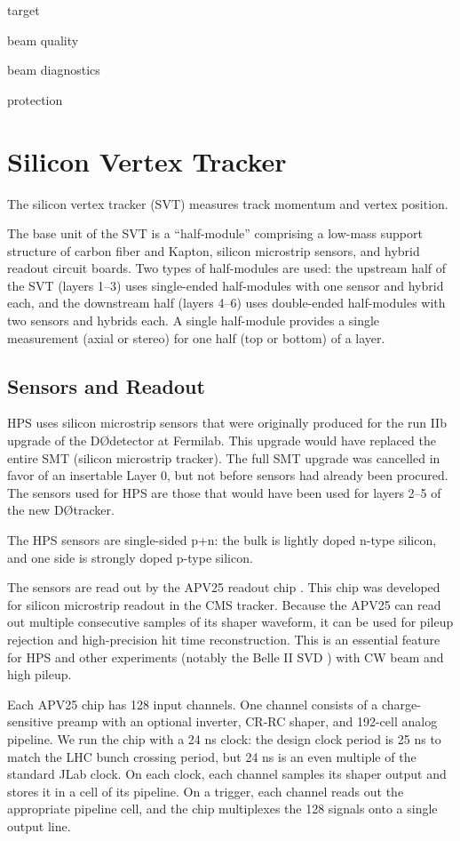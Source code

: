 target

beam quality

beam diagnostics

protection

\section{Silicon Vertex Tracker}
The silicon vertex tracker (SVT) measures track momentum and vertex position.



The base unit of the SVT is a ``half-module'' comprising a low-mass support structure of carbon fiber and Kapton, silicon microstrip sensors, and hybrid readout circuit boards.
Two types of half-modules are used: the upstream half of the SVT (layers 1--3) uses single-ended half-modules with one sensor and hybrid each, and the downstream half (layers 4--6) uses double-ended half-modules with two sensors and hybrids each.
A single half-module provides a single measurement (axial or stereo) for one half (top or bottom) of a layer.

\subsection{Sensors and Readout}
HPS uses silicon microstrip sensors that were originally produced for the run IIb upgrade of the D\O detector at Fermilab.
This upgrade would have replaced the entire SMT (silicon microstrip tracker).
The full SMT upgrade was cancelled in favor of an insertable Layer 0, but not before sensors had already been procured.
The sensors used for HPS are those that would have been used for layers 2--5 of the new D\O tracker.

The HPS sensors are single-sided p+n: the bulk is lightly doped n-type silicon, and one side is strongly doped p-type silicon.

The sensors are read out by the APV25 readout chip \cite{french_design_2001}.
This chip was developed for silicon microstrip readout in the CMS tracker.
Because the APV25 can read out multiple consecutive samples of its shaper waveform, it can be used for pileup rejection and high-precision hit time reconstruction.
This is an essential feature for HPS and other experiments (notably the Belle II SVD \cite{liu_belle_2012}) with CW beam and high pileup.

Each APV25 chip has 128 input channels.
One channel consists of a charge-sensitive preamp with an optional inverter, CR-RC shaper, and 192-cell analog pipeline.
We run the chip with a 24 ns clock: the design clock period is 25 ns to match the LHC bunch crossing period, but 24 ns is an even multiple of the standard JLab clock.
On each clock, each channel samples its shaper output and stores it in a cell of its pipeline.
On a trigger, each channel reads out the appropriate pipeline cell, and the chip multiplexes the 128 signals onto a single output line.

